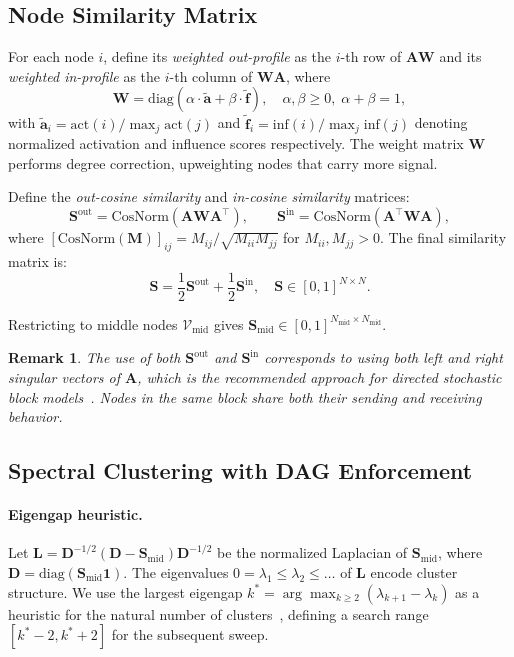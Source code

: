 \documentclass[11pt]{article}
\newtheorem{remark}[theorem]{Remark}
\newcommand{\cV}{\mathcal{V}}
\newcommand{\bA}{\mathbf{A}}
\newcommand{\bD}{\mathbf{D}}
\newcommand{\bL}{\mathbf{L}}
\newcommand{\bM}{\mathbf{M}}
\newcommand{\bS}{\mathbf{S}}
\newcommand{\bW}{\mathbf{W}}
\newcommand{\1}{\mathbbm{1}}
\begin{document}
\subsection{Node Similarity Matrix}
\label{sec:similarity}

For each node $i$, define its \emph{weighted out-profile} as the $i$-th row of $\bA \bW$ and its \emph{weighted in-profile} as the $i$-th column of $\bW \bA$, where
\[
  \bW = \mathrm{diag}\!\left(\alpha \cdot \tilde{\mathbf{a}} + \beta \cdot \tilde{\mathbf{f}}\right), \quad \alpha, \beta \ge 0,\; \alpha + \beta = 1,
\]
with $\tilde{\mathbf{a}}_i = \mathrm{act}(i) / \max_j \mathrm{act}(j)$ and $\tilde{\mathbf{f}}_i = \mathrm{inf}(i) / \max_j \mathrm{inf}(j)$ denoting normalized activation and influence scores respectively.
The weight matrix $\bW$ performs degree correction, upweighting nodes that carry more signal.

Define the \emph{out-cosine similarity} and \emph{in-cosine similarity} matrices:
\[
  \bS^{\mathrm{out}} = \mathrm{CosNorm}(\bA \bW \bA^\top), \qquad
  \bS^{\mathrm{in}}  = \mathrm{CosNorm}(\bA^\top \bW \bA),
\]
where $[\mathrm{CosNorm}(\bM)]_{ij} = M_{ij} / \sqrt{M_{ii} M_{jj}}$ for $M_{ii}, M_{jj} > 0$.
The final similarity matrix is:
\begin{equation}
  \bS = \frac{1}{2}\bS^{\mathrm{out}} + \frac{1}{2}\bS^{\mathrm{in}}, \quad \bS \in [0,1]^{N \times N}.
  \label{eq:similarity}
\end{equation}

Restricting to middle nodes $\cV_{\mathrm{mid}}$ gives $\bS_{\mathrm{mid}} \in [0,1]^{N_{\mathrm{mid}} \times N_{\mathrm{mid}}}$.

\begin{remark}
  The use of both $\bS^{\mathrm{out}}$ and $\bS^{\mathrm{in}}$ corresponds to using both left and right singular vectors of $\bA$, which is the recommended approach for directed stochastic block models~\citep{rohe2016co}.
  Nodes in the same block share both their sending and receiving behavior.
\end{remark}

\subsection{Spectral Clustering with DAG Enforcement}
\label{sec:clustering}

\paragraph{Eigengap heuristic.}
Let $\bL = \bD^{-1/2}(\bD - \bS_{\mathrm{mid}})\bD^{-1/2}$ be the normalized Laplacian of $\bS_{\mathrm{mid}}$, where $\bD = \mathrm{diag}(\bS_{\mathrm{mid}} \mathbf{1})$.
The eigenvalues $0 = \lambda_1 \le \lambda_2 \le \ldots$ of $\bL$ encode cluster structure.
We use the largest eigengap $k^* = \arg\max_{k \ge 2}(\lambda_{k+1} - \lambda_k)$ as a heuristic for the natural number of clusters~\citep{von2007tutorial}, defining a search range $[k^* - 2, k^* + 2]$ for the subsequent sweep.
\end{document}
